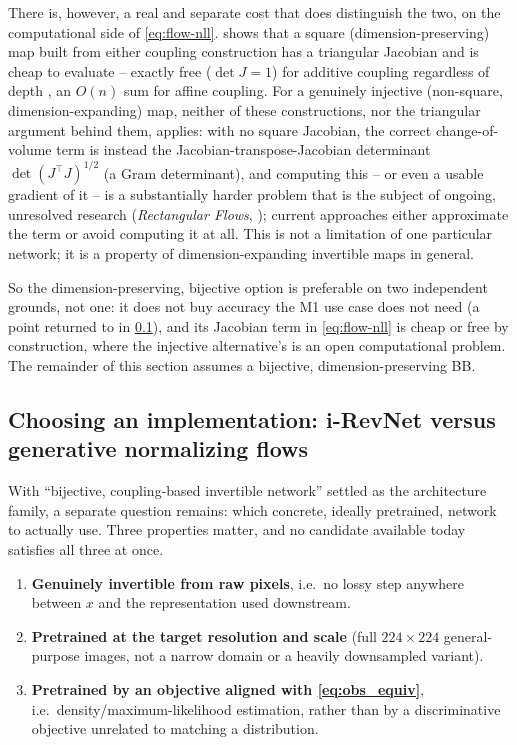 There is, however, a real and separate cost that does distinguish the two, on the computational side of
\cref{eq:flow-nll}.  shows that a square (dimension-preserving) map built from
either coupling construction has a triangular Jacobian and is cheap to evaluate -- exactly free
($\det J=1$) for additive coupling regardless of depth \cite{gomez2017}, an $O(n)$ sum for affine
coupling. For a genuinely injective (non-square, dimension-expanding) map, neither of these
constructions, nor the triangular argument behind them, applies: with no square Jacobian, the correct
change-of-volume term is instead the Jacobian-transpose-Jacobian determinant $\det(J^\top J)^{1/2}$ (a
Gram determinant), and computing this -- or even a usable gradient of it -- is a substantially harder
problem that is the subject of ongoing, unresolved research (\emph{Rectangular Flows}, \cite{caterini2021});
current approaches either approximate the term or avoid computing it at all. This is not a limitation of
one particular network; it is a property of dimension-expanding invertible maps in general.

So the dimension-preserving, bijective option is preferable on two independent grounds, not one: it does
not buy accuracy the M1 use case does not need (a point returned to in \cref{sec:flow:implementation}),
and its Jacobian term in \cref{eq:flow-nll} is cheap or free by construction, where the injective
alternative's is an open computational problem. The remainder of this section assumes a bijective,
dimension-preserving BB.

\subsection{Choosing an implementation: i-RevNet versus generative normalizing flows}
\label{sec:flow:implementation}
With ``bijective, coupling-based invertible network'' settled as the architecture family, a separate
question remains: which concrete, ideally pretrained, network to actually use. Three properties matter,
and no candidate available today satisfies all three at once.
\begin{enumerate}[label=(\roman*),leftmargin=2.2em]
\item \label{item:inv} \textbf{Genuinely invertible from raw pixels}, i.e.\ no lossy step anywhere
      between $x$ and the representation used downstream.
\item \label{item:res} \textbf{Pretrained at the target resolution and scale} (full $224\times224$
      general-purpose images, not a narrow domain or a heavily downsampled variant).
\item \label{item:obj} \textbf{Pretrained by an objective aligned with \cref{eq:obs_equiv}}, i.e.\
      density/maximum-likelihood estimation, rather than by a discriminative objective unrelated to
      matching a distribution.
\end{enumerate}

